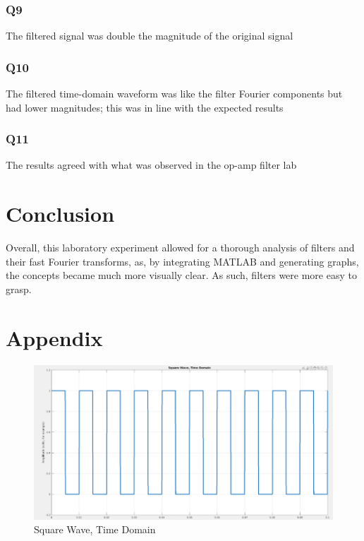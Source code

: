 \documentclass[
	letterpaper, %
	10pt, %
]{CSUniSchoolLabReport}
\begin{document}
\subsubsection{Q9} The filtered signal was double the magnitude of the original signal

\subsubsection{Q10} The filtered time-domain waveform was like the filter Fourier components but had lower magnitudes; this was in line with the expected results

\subsubsection{Q11} The results agreed with what was observed in the op-amp filter lab

\section{Conclusion}

Overall, this laboratory experiment allowed for a thorough analysis of filters and their fast Fourier transforms, as, by integrating MATLAB and generating graphs, the concepts became much more visually clear. As such, filters were more easy to grasp.

\section{Appendix}

\begin{figure}[h!]
  \centering
  \includegraphics[width=.9\textwidth]{Figures/L13Q1.png}
  \caption{Square Wave, Time Domain}
  \label{fig:1}
\end{figure}
\end{document}
